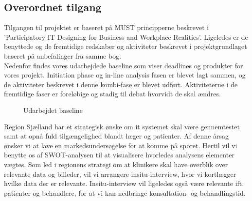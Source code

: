 \subsection{Overordnet tilgang}
Tilgangen til projektet er baseret på MUST principperne beskrevet i 'Participatory IT Designing for Business and Workplace Realities'. Ligeledes er de benyttede og de fremtidige redskaber og aktiviteter beskrevet i projektgrundlaget baseret på anbefalinger fra samme bog.\\
Nedenfor findes vores udarbejdede baseline som viser deadlines og produkter for vores projekt. Initiation phase og in-line analysis fasen er blevet lagt sammen, og de aktiviteter beskrevet i denne kombi-fase er blevet udført. Aktiviteterne i de fremtidige faser er foreløbige og stadig til debat hvorvidt de skal ændres. 
\begin{figure}[h!]
	\caption{Udarbejdet baseline}
\end{figure}
Region Sjælland har et strategisk ønske om it systemet skal være gennemtestet samt at opnå fuld tilgængelighed blandt læger og patienter. Af denne årsag ønsker vi at lave en markedsundersøgelse for at komme på sporet. Hertil vil vi benytte os af SWOT-analysen til at visualisere hvorledes analysens elementer vægtes.
Som led i regionens strategi om at klinikere skal have overblik over relevante data og billeder, vil vi arrangere insitu-interview, hvor vi kortlægger hvilke data der er relevante. Insitu-interview vil ligeledes også være relevante ift. patienter og behandlere, for at vi kan nedbringe konsultation- og behandlingstid.   